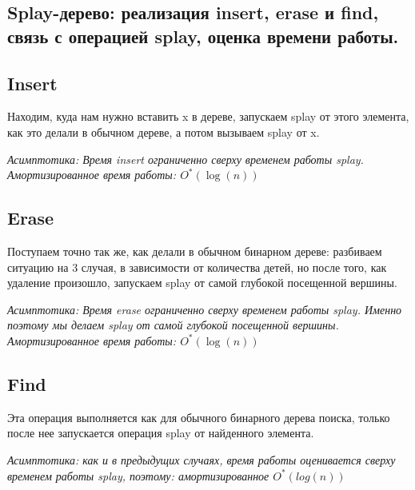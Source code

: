 \subsection{Splay-дерево: реализация insert, erase и find, связь с операцией splay, оценка времени работы.}

\subsection*{Insert }

Находим, куда нам нужно вставить x в дереве, запускаем splay от этого элемента, как это делали в обычном дереве, а потом вызываем splay от x. 

\textit{Асимптотика: Время insert ограниченно сверху временем работы splay. Амортизированное время работы: $O^*(\log(n))$}

\subsection*{Erase }

Поступаем точно так же, как делали в обычном бинарном дереве: разбиваем ситуацию на 3 случая, в зависимости от количества детей, но после того, как удаление произошло, запускаем splay от самой глубокой посещенной вершины.

\textit{Асимптотика: Время erase ограниченно сверху временем работы splay. Именно поэтому мы делаем splay от самой глубокой посещенной вершины. Амортизированное время работы: $O^*(\log(n))$}

\subsection*{Find }

Эта операция выполняется как для обычного бинарного дерева поиска, только после нее запускается операция splay от найденного элемента.

\textit{Асимптотика: как и в предыдущих случаях, время работы оценивается сверху временем работы splay, поэтому: амортизированное $O^*(log(n))$}

\pagebreak